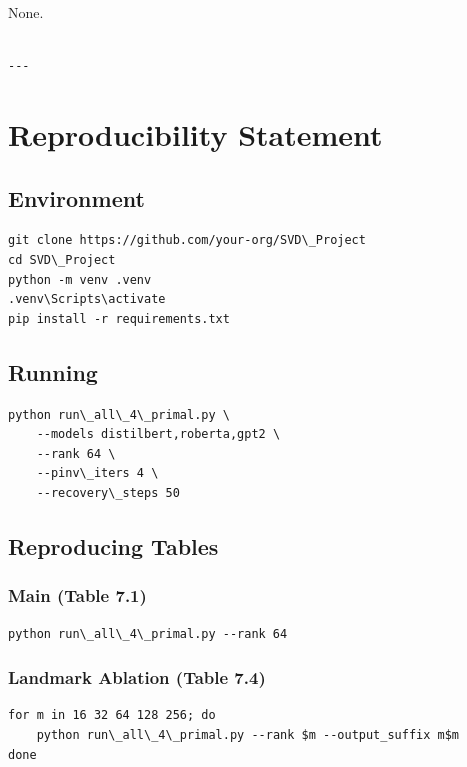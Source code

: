 None.
\begin{lstlisting}

---
\end{lstlisting}


\section{Reproducibility Statement}

\subsection{Environment}

\begin{lstlisting}
git clone https://github.com/your-org/SVD\_Project
cd SVD\_Project
python -m venv .venv
.venv\Scripts\activate
pip install -r requirements.txt
\end{lstlisting}

\subsection{Running}

\begin{lstlisting}
python run\_all\_4\_primal.py \
    --models distilbert,roberta,gpt2 \
    --rank 64 \
    --pinv\_iters 4 \
    --recovery\_steps 50
\end{lstlisting}

\subsection{Reproducing Tables}

\subsubsection{Main (Table 7.1)}
\begin{lstlisting}
python run\_all\_4\_primal.py --rank 64
\end{lstlisting}

\subsubsection{Landmark Ablation (Table 7.4)}
\begin{lstlisting}
for m in 16 32 64 128 256; do
    python run\_all\_4\_primal.py --rank $m --output_suffix m$m
done
\end{lstlisting}

